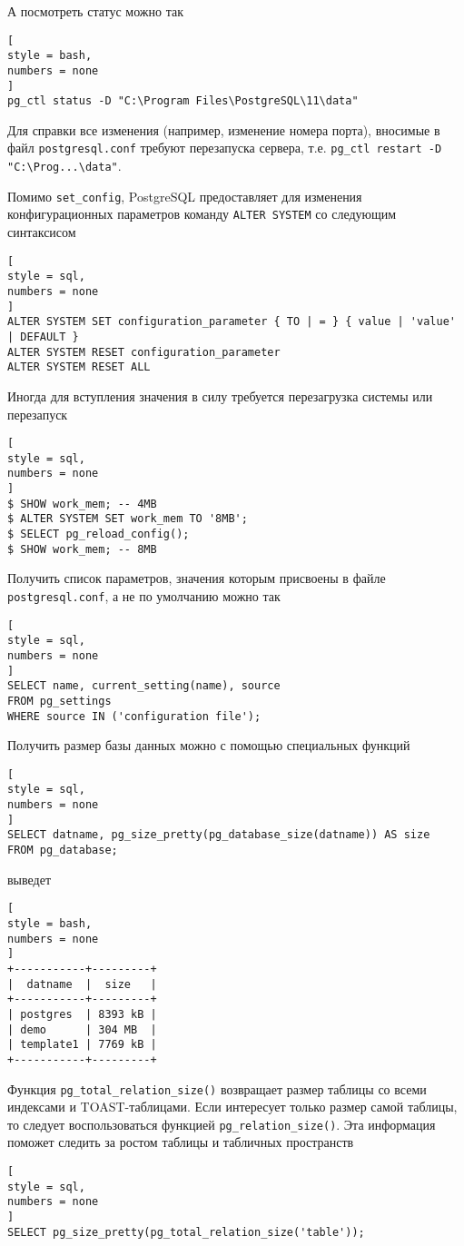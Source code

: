 \documentclass[%
	11pt,
	a4paper,
	utf8,
		]{article}
\begin{document}
А посмотреть статус можно так
\begin{lstlisting}[
style = bash,
numbers = none
]
pg_ctl status -D "C:\Program Files\PostgreSQL\11\data"
\end{lstlisting}

Для справки все изменения (например, изменение номера порта), вносимые в файл \texttt{postgresql.conf} требуют перезапуска сервера, т.е. \verb|pg_ctl restart -D "C:\Prog...\data"|.

Помимо \texttt{set\_config}, PostgreSQL предоставляет для изменения конфигурационных параметров команду \texttt{ALTER SYSTEM} со следующим синтаксисом
\begin{lstlisting}[
style = sql,
numbers = none
]
ALTER SYSTEM SET configuration_parameter { TO | = } { value | 'value' | DEFAULT }
ALTER SYSTEM RESET configuration_parameter
ALTER SYSTEM RESET ALL
\end{lstlisting}

Иногда для вступления значения в силу требуется перезагрузка системы или перезапуск
\begin{lstlisting}[
style = sql,
numbers = none
]
$ SHOW work_mem; -- 4MB
$ ALTER SYSTEM SET work_mem TO '8MB';
$ SELECT pg_reload_config();
$ SHOW work_mem; -- 8MB
\end{lstlisting}

Получить список параметров, значения которым присвоены в файле \texttt{postgresql.conf}, а не по умолчанию можно так
\begin{lstlisting}[
style = sql,
numbers = none
]
SELECT name, current_setting(name), source
FROM pg_settings
WHERE source IN ('configuration file');
\end{lstlisting}

Получить размер базы данных можно с помощью специальных функций
\begin{lstlisting}[
style = sql,
numbers = none
]
SELECT datname, pg_size_pretty(pg_database_size(datname)) AS size
FROM pg_database;
\end{lstlisting}
выведет
\begin{lstlisting}[
style = bash,
numbers = none
]
+-----------+---------+
|  datname  |  size   |
+-----------+---------+
| postgres  | 8393 kB |
| demo      | 304 MB  |
| template1 | 7769 kB |
+-----------+---------+
\end{lstlisting}

Функция \texttt{pg\_total\_relation\_size()} возвращает размер таблицы со всеми индексами и TOAST-таблицами. Если интересует только размер самой таблицы, то следует воспользоваться функцией \texttt{pg\_relation\_size()}. Эта информация поможет следить за ростом таблицы и табличных пространств
\begin{lstlisting}[
style = sql,
numbers = none
]
SELECT pg_size_pretty(pg_total_relation_size('table'));
\end{lstlisting}
\end{document}
